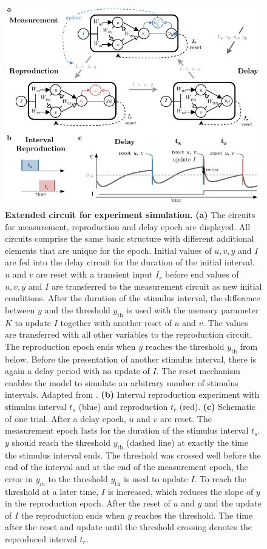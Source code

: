 \documentclass[10pt]{article}
\begin{document}
\begin{figure}
	\centering
	\includegraphics{figures/epochs.pdf}
	\caption{\textbf{Extended circuit for experiment simulation.} 
	\textbf{(a)} The circuits for measurement, reproduction and delay epoch are displayed. All circuits comprise the same basic structure with different additional elements that are unique for the epoch. Initial values of $u, v, y$ and $I$ are fed into the delay circuit for the duration of the initial interval. $u$ and $v$ are reset with a transient input $I_r$ before end values of $u, v, y$ and $I$ are transferred to the measurement circuit as new initial conditions. After the duration of the stimulus interval, the difference between $y$ and the threshold $y_{\text{th}}$ is used with the memory parameter $K$ to update $I$ together with another reset of $u$ and $v$. The values are transferred with all other variables to the reproduction circuit. The reproduction epoch ends when $y$ reaches the threshold $y_{\text{th}}$ from below. Before the presentation of another stimulus interval, there is again a delay period with no update of $I$. The reset mechanism enables the model to simulate an arbitrary number of stimulus intervals. Adapted from \cite{Egger2020}.
	\textbf{(b)} Interval reproduction experiment with stimulus interval $t_s$ (blue) and reproduction $t_r$ (red).
	\textbf{(c)} Schematic of one trial. After a delay epoch, $u$ and $v$ are reset. The measurement epoch lasts for the duration of the stimulus interval $t_s$. $y$ should reach the threshold $y_{\text{th}}$ (dashed line) at exactly the time the stimulus interval ends. The threshold was crossed well before the end of the interval and at the end of the measurement epoch, the error in $y_m$ to the threshold $y_{\text{th}}$ is used to update $I$. To reach the threshold at a later time, $I$ is increased, which reduces the slope of $y$ in the reproduction epoch. After the reset of $u$ and $y$ and the update of $I$ the reproduction ends when $y$ reaches the threshold. The time after the reset and update until the threshold crossing denotes the reproduced interval $t_r$.}
\label{fig:epochs}
\end{figure}
\end{document}
